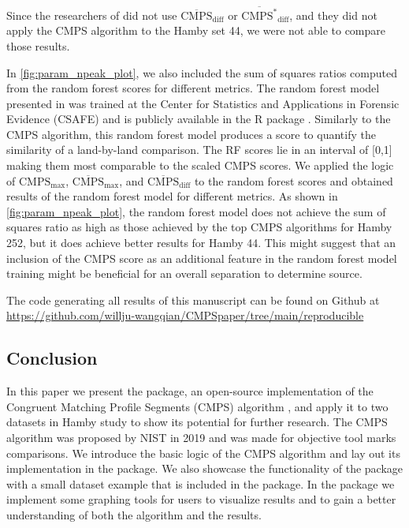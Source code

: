 Since the researchers of \citet{cmps} did not use
\(\mathrm{\overline{CMPS}_{diff}}\) or
\(\mathrm{\overline{CMPS^*}_{diff}}\), and they did not apply the CMPS
algorithm to the Hamby set 44, we were not able to compare those
results.

In \autoref{fig:param_npeak_plot}, we also included the sum of squares
ratios computed from the random forest scores \citep{aoas} for different
metrics. The random forest model presented in \citet{aoas} was trained
at the Center for Statistics and Applications in Forensic Evidence
(CSAFE) and is publicly available in the R package 
\citep{bulletxtrctr}. Similarly to the CMPS algorithm, this random
forest model produces a score to quantify the similarity of a
land-by-land comparison. The RF scores lie in an interval of {[}0,1{]}
making them most comparable to the scaled CMPS scores. We applied the
logic of \(\mathrm{{CMPS}_{max}}\), \(\mathrm{\overline{CMPS}_{max}}\),
and \(\mathrm{\overline{CMPS}_{diff}}\) to the random forest scores and
obtained results of the random forest model for different metrics. As
shown in \autoref{fig:param_npeak_plot}, the random forest model does
not achieve the sum of squares ratio as high as those achieved by the
top CMPS algorithms for Hamby 252, but it does achieve better results
for Hamby 44. This might suggest that an inclusion of the CMPS score as
an additional feature in the random forest model training might be
beneficial for an overall separation to determine source.

The code generating all results of this manuscript can be found on
Github at
\url{https://github.com/willju-wangqian/CMPSpaper/tree/main/reproducible}

\hypertarget{conclusion}{%
\subsection{Conclusion}\label{conclusion}}


In this paper we present the  package, an open-source
implementation of the Congruent Matching Profile Segments (CMPS)
algorithm \citep{cmps}, and apply it to two datasets in Hamby study
\citep{hamby} to show its potential for further research. The CMPS
algorithm was proposed by NIST in 2019 and was made for objective tool
marks comparisons. We introduce the basic logic of the CMPS algorithm
and lay out its implementation in the  package. We also
showcase the functionality of the  package with a small
dataset example that is included in the package. In the 
package we implement some graphing tools for users to visualize results
and to gain a better understanding of both the algorithm and the
results.

